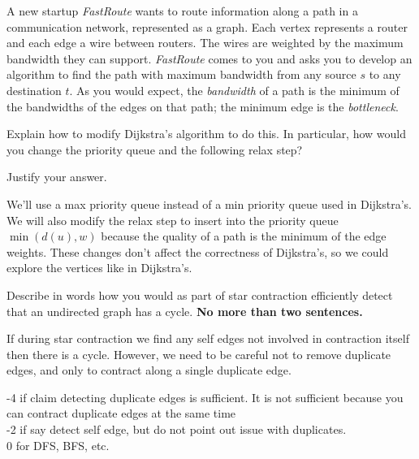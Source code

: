 \begin{problem}[5]

A new startup \emph{FastRoute} wants to route information along a path
in a communication network, represented as a graph. Each vertex
represents a router and each edge a wire between routers. The wires
are weighted by the maximum bandwidth they can
support. \emph{FastRoute} comes to you and asks you to develop an
algorithm to find the path with maximum bandwidth from any source $s$
to any destination $t$. As you would expect, the \emph{bandwidth} of a
path is the minimum of the bandwidths of the edges on that path; the
minimum edge is the \emph{bottleneck}.

\ask
Explain how to modify Dijkstra's algorithm to do this. In particular, how would
you change the priority queue and the following relax step?

\begin{quote}
\end{quote}

Justify your answer.

\sol
  We'll use a max priority queue instead of a min priority queue used
  in Dijkstra's. We will also modify the relax step to insert into the
  priority queue $\min(d(u), w)$ because the quality of a path is the
  minimum of the edge weights. These changes don't affect the
  correctness of Dijkstra's, so we could explore the vertices like in
  Dijkstra's.
\end{problem}


%

\begin{problem}
\ask
Describe in words how you would as part of star contraction 
efficiently detect that an undirected graph has a cycle.  \textbf{No more than two sentences.}

\sol
If during star contraction we find any self edges not involved in
contraction itself then there is a cycle.   However,
we need to be careful not to remove duplicate edges, and only to
contract along a single duplicate edge.

-4 if claim detecting duplicate edges is sufficient.  It is not sufficient because you can contract duplicate edges at the same time\\
%
-2 if say detect self edge, but do not point out issue with duplicates.\\
%
0 for DFS, BFS, etc.
\end{problem}


